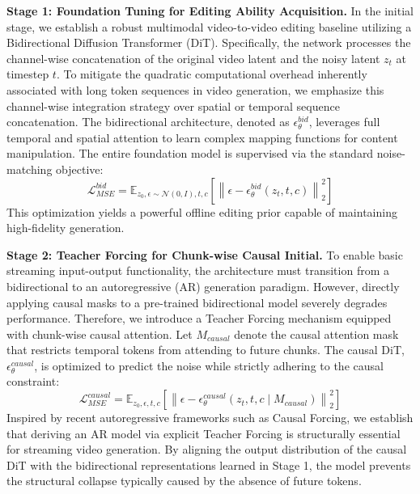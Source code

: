 \documentclass{llmxive}
\begin{document}
\noindent \textbf{Stage 1: Foundation Tuning for Editing Ability Acquisition.}
In the initial stage, we establish a robust multimodal video-to-video editing baseline utilizing a Bidirectional Diffusion Transformer (DiT). Specifically, the network processes the channel-wise concatenation of the original video latent and the noisy latent $z_t$ at timestep $t$. To mitigate the quadratic computational overhead inherently associated with long token sequences in video generation, we emphasize this channel-wise integration strategy over spatial or temporal sequence concatenation. The bidirectional architecture, denoted as $\epsilon_{\theta}^{bid}$, leverages full temporal and spatial attention to learn complex mapping functions for content manipulation. The entire foundation model is supervised via the standard noise-matching objective:
$$\mathcal{L}_{MSE}^{bid}=\mathbb{E}_{z_0,\epsilon\sim\mathcal{N}(0,I),t,c}\left[\left\|\epsilon-\epsilon_{\theta}^{bid}(z_t,t,c)\right\|_2^2\right]$$
This optimization yields a powerful offline editing prior capable of maintaining high-fidelity generation.

\noindent \textbf{Stage 2: Teacher Forcing for Chunk-wise Causal Initial.}
To enable basic streaming input-output functionality, the architecture must transition from a bidirectional to an autoregressive (AR) generation paradigm. However, directly applying causal masks to a pre-trained bidirectional model severely degrades performance. Therefore, we introduce a Teacher Forcing mechanism equipped with chunk-wise causal attention. Let $M_{causal}$ denote the causal attention mask that restricts temporal tokens from attending to future chunks. The causal DiT, $\epsilon_{\theta}^{causal}$, is optimized to predict the noise while strictly adhering to the causal constraint:
$$\mathcal{L}_{MSE}^{causal}=\mathbb{E}_{z_0,\epsilon,t,c}\left[\left\|\epsilon-\epsilon_{\theta}^{causal}(z_t,t,c\mid M_{causal})\right\|_2^2\right]$$
Inspired by recent autoregressive frameworks such as Causal Forcing, we establish that deriving an AR model via explicit Teacher Forcing is structurally essential for streaming video generation. By aligning the output distribution of the causal DiT with the bidirectional representations learned in Stage 1, the model prevents the structural collapse typically caused by the absence of future tokens.
\end{document}
